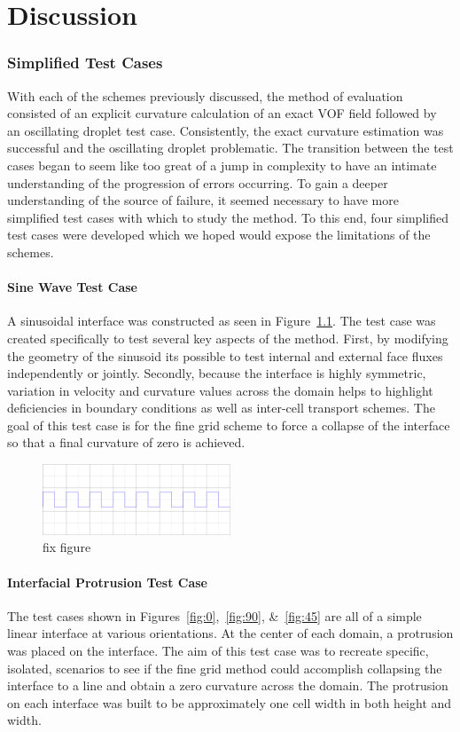 \chapter{Discussion}  
\subsection{Simplified Test Cases}
With each of the schemes previously discussed, the method of evaluation consisted of an explicit curvature calculation of an exact VOF field followed by an oscillating droplet test case. Consistently, the exact curvature estimation was successful and the oscillating droplet problematic. The transition between the test cases began to seem like too great of a jump in complexity to have an intimate understanding of the progression of errors occurring. To gain a deeper understanding of the source of failure, it seemed necessary to have more simplified test cases with which to study the method. To this end, four simplified test cases were developed which we hoped would expose the limitations of the schemes.

\subsubsection{Sine Wave Test Case}
A sinusoidal interface was constructed as seen in Figure~\ref{fig:sine}. The test case was created specifically to test several key aspects of the method. First, by modifying the geometry of the sinusoid its possible to test internal and external face fluxes independently or jointly. Secondly, because the interface is highly symmetric, variation in velocity and curvature values across the domain helps to highlight deficiencies in boundary conditions as well as inter-cell transport schemes. The goal of this test case is for the fine grid scheme to force a collapse of the interface so that a final curvature of zero is achieved.  
 \begin{figure}
 	\centering
 	\includegraphics[width=0.5\textwidth]{figs/sine}
 	\caption{fix figure}
 	\label{fig:sine}
 \end{figure}

\subsubsection{Interfacial Protrusion Test Case}
The test cases shown in Figures~\ref{fig:0},~\ref{fig:90}, \&~\ref{fig:45} are all of a simple linear interface at various orientations. At the center of each domain, a protrusion was placed on the interface. The aim of this test case was to recreate specific, isolated, scenarios to see if the fine grid method could accomplish collapsing the interface to a line and obtain a zero curvature across the domain. The protrusion on each interface was built to be approximately one cell width in both height and width. 

